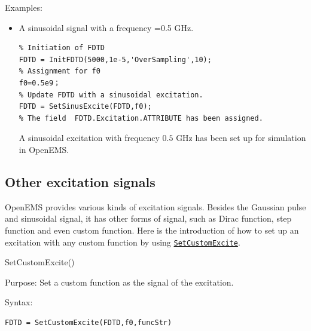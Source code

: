 \begin{FontDescr}{Examples:}
 \begin{itemize}
\item A sinusoidal signal with a  frequency =0.5 GHz.
\begin{lstlisting}
% Initiation of FDTD
FDTD = InitFDTD(5000,1e-5,'OverSampling',10);
% Assignment for f0
f0=0.5e9；
% Update FDTD with a sinusoidal excitation.
FDTD = SetSinusExcite(FDTD,f0);
% The field  FDTD.Excitation.ATTRIBUTE has been assigned.
\end{lstlisting}
A sinusoidal excitation with frequency $0.5$ GHz has been set up for simulation in OpenEMS.
\end{itemize}
\end{FontDescr}


    \subsection{Other excitation signals}\label{subsec:Other excitation signals}
OpenEMS provides various kinds of excitation signals. Besides the Gaussian pulse and sinusoidal signal, it has other forms of signal, such as Dirac function, step function and even custom function. Here is the introduction of how to set up an excitation with any custom function by using \hyperref[func:SetCustomExcite]{\texttt{SetCustomExcite}}.

\begin{FontNameFunct}{SetCustomExcite()}
 \label{func:SetCustomExcite}
\end{FontNameFunct}
	  
\begin{FontDescr}{Purpose:}
Set a custom function as the signal of the excitation.
\end{FontDescr}

\begin{FontDescr}{Syntax:}
      \begin{lstlisting}
FDTD = SetCustomExcite(FDTD,f0,funcStr)
      \end{lstlisting}
\end{FontDescr}
      
